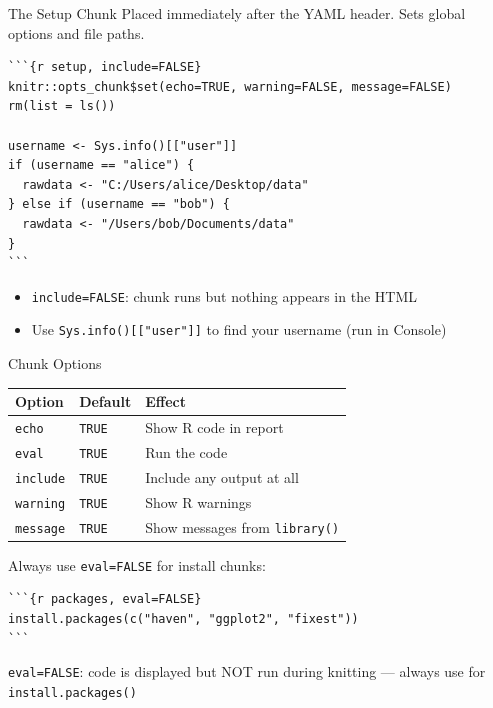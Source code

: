\documentclass[dvipsnames,hyperref={pdfpagelabels=false}]{beamer}
\begin{document}
\begin{frame}[fragile]{The Setup Chunk}
  Placed immediately after the YAML header. Sets global options and file paths.

  \begin{lstlisting}[style=rslide]
```{r setup, include=FALSE}
knitr::opts_chunk$set(echo=TRUE, warning=FALSE, message=FALSE)
rm(list = ls())

username <- Sys.info()[["user"]]
if (username == "alice") {
  rawdata <- "C:/Users/alice/Desktop/data"
} else if (username == "bob") {
  rawdata <- "/Users/bob/Documents/data"
}
```
  \end{lstlisting}

  \vspace{0.3em}
  \begin{itemize}
    \item \texttt{include=FALSE}: chunk runs but nothing appears in the HTML
    \item Use \texttt{Sys.info()[["user"]]} to find your username (run in Console)
  \end{itemize}
\end{frame}

\begin{frame}[fragile]{Chunk Options}
  \small
  \begin{center}
    \begin{tabular}{lll}
      \toprule
      \textbf{Option} & \textbf{Default} & \textbf{Effect} \\
      \midrule
      \texttt{echo}    & \texttt{TRUE} & Show R code in report \\
      \texttt{eval}    & \texttt{TRUE} & Run the code \\
      \texttt{include} & \texttt{TRUE} & Include any output at all \\
      \texttt{warning} & \texttt{TRUE} & Show R warnings \\
      \texttt{message} & \texttt{TRUE} & Show messages from \texttt{library()} \\
      \bottomrule
    \end{tabular}
  \end{center}

  \vspace{0.5em}
  Always use \texttt{eval=FALSE} for install chunks:
  \begin{lstlisting}[style=rslide]
```{r packages, eval=FALSE}
install.packages(c("haven", "ggplot2", "fixest"))
```
  \end{lstlisting}

  \texttt{eval=FALSE}: code is displayed but NOT run during knitting ---
  always use for \texttt{install.packages()}
\end{frame}
\end{document}
